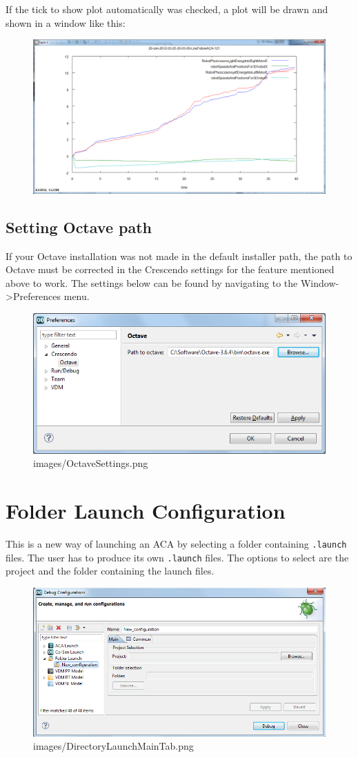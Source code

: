 \documentclass{crescendorepchap}
\begin{document}
If the tick to show plot automatically was checked, a plot will be drawn
and shown in a window like this:

\begin{figure}[htbp]
\centering
\includegraphics[width=.6\textwidth]{images/OctavePlotting.png}
\caption{}
\end{figure}

\subsection{Setting Octave path}

If your Octave installation was not made in the default installer path,
the path to Octave must be corrected in the Crescendo settings for the
feature mentioned above to work. The settings below can be found by
navigating to the Window-\textgreater{}Preferences menu.

\begin{figure}[htbp]
\centering
\includegraphics[width=.6\textwidth]{images/OctaveSettings.png}
\caption{images/OctaveSettings.png}
\end{figure}

\section{Folder Launch Configuration}

This is a new way of launching
an ACA by selecting a folder containing \texttt{.launch} files. The user has to
produce its own \texttt{.launch} files. The options to select are the project
and the folder containing the launch files.

\begin{figure}[htbp]
\centering
\includegraphics[width=.6\textwidth]{images/DirectoryLaunchMainTab.png}
\caption{images/DirectoryLaunchMainTab.png}
\end{figure}
\end{document}
